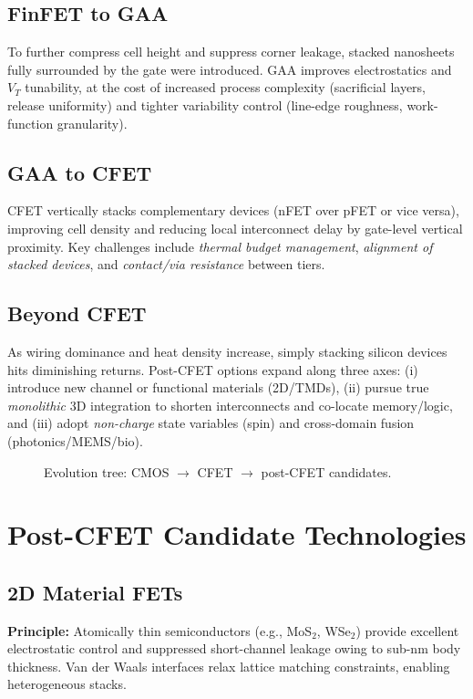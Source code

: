 \documentclass[conference]{IEEEtran}
\newcommand{\figpath}{figures}
\newcommand{\tikzcol}[2][\linewidth]{\resizebox{#1}{!}{}}
\begin{document}
\subsection{FinFET to GAA}
To further compress cell height and suppress corner leakage, stacked nanosheets fully surrounded by the gate were introduced.
GAA improves electrostatics and $V_{T}$ tunability, at the cost of increased process complexity (sacrificial layers, release uniformity) and tighter variability control (line-edge roughness, work-function granularity).

\subsection{GAA to CFET}
CFET vertically stacks complementary devices (nFET over pFET or vice versa), improving cell density and reducing local interconnect delay by gate-level vertical proximity.
Key challenges include \emph{thermal budget management}, \emph{alignment of stacked devices}, and \emph{contact/via resistance} between tiers.

\subsection{Beyond CFET}
As wiring dominance and heat density increase, simply stacking silicon devices hits diminishing returns.
Post-CFET options expand along three axes: (i) introduce new channel or functional materials (2D/TMDs), (ii) pursue true \emph{monolithic} 3D integration to shorten interconnects and co-locate memory/logic, and (iii) adopt \emph{non-charge} state variables (spin) and cross-domain fusion (photonics/MEMS/bio).

\begin{figure*}[!t]
  \centering
  \tikzcol[0.9\textwidth]{\figpath/evolution_tree.tex}
  \caption{Evolution tree: CMOS $\rightarrow$ CFET $\rightarrow$ post-CFET candidates.}
  \label{fig:evolution}
\end{figure*}

\section{Post-CFET Candidate Technologies}

\subsection{2D Material FETs}
\textbf{Principle:}
Atomically thin semiconductors (e.g., MoS$_2$, WSe$_2$) provide excellent electrostatic control and suppressed short-channel leakage owing to sub-nm body thickness.
Van der Waals interfaces relax lattice matching constraints, enabling heterogeneous stacks.
\end{document}
